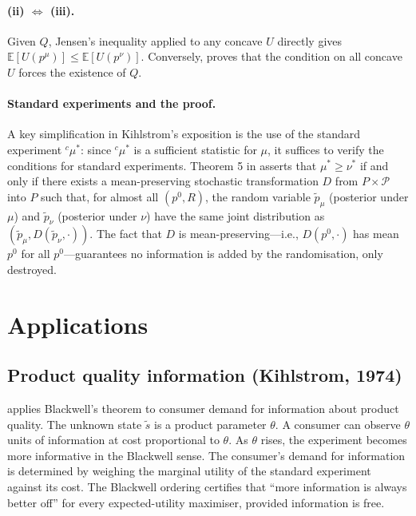\documentclass[12pt]{article}
\begin{document}
\paragraph{(ii) $\Leftrightarrow$ (iii).}
Given $Q$, Jensen's inequality applied to any concave $U$ directly gives
$\mathbb{E}[U(p^\mu)] \leq \mathbb{E}[U(p^\nu)]$.  Conversely, \citet{blackwell1953}
proves that the condition on all concave $U$ forces the existence of $Q$.

\paragraph{Standard experiments and the proof.}
A key simplification in Kihlstrom's exposition is the use of the standard
experiment ${}^c\mu^*$: since ${}^c\mu^*$ is a sufficient statistic for $\mu$,
it suffices to verify the conditions for standard experiments.  Theorem 5 in
\citet{kihlstrom1984} asserts that $\mu^* \geq \nu^*$ if and only if there
exists a mean-preserving stochastic transformation $D$ from $P \times \mathscr{P}$
into $P$ such that, for almost all $(p^0, R)$, the random variable
$\tilde{p}_\mu$ (posterior under $\mu$) and $\tilde{p}_\nu$ (posterior under $\nu$)
have the same joint distribution as $(\tilde{p}_\mu, D(\tilde{p}_\nu, \cdot))$.
The fact that $D$ is mean-preserving—i.e., $D(p^0, \cdot)$ has mean $p^0$
for all $p^0$—guarantees no information is added by the randomisation, only destroyed.

\section{Applications}

\subsection{Product quality information (Kihlstrom, 1974)}

\citet{kihlstrom1974a} applies Blackwell's theorem to consumer demand for
information about product quality.  The unknown state $\tilde{s}$ is a
product parameter $\theta$.  A consumer can observe $\theta$ units of
information at cost proportional to $\theta$.  As $\theta$ rises, the
experiment becomes more informative in the Blackwell sense.  The consumer's
demand for information is determined by weighing the marginal utility of the
standard experiment against its cost.  The Blackwell ordering certifies that
``more information is always better off'' for every expected-utility maximiser,
provided information is free.
\end{document}
